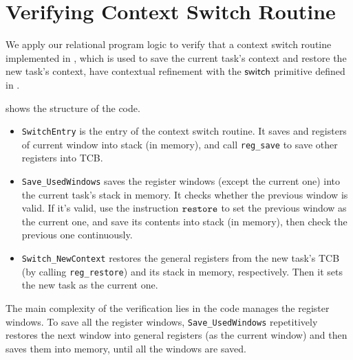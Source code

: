 \section{Verifying Context Switch Routine}
\label{sec:ctxswitch}

\indent
We apply our relational program logic to verify
that a context switch routine implemented in \sparc,
which is used to save the current task's context and
restore the new task's context, 
have contextual refinement with the $\mathsf{switch}{}$ primitive 
defined in \Sec{\ref{sec:refine-verification-sparc}}. 

\Fig{\ref{fig:The Structure of Context Switch Routine}}
shows the structure of the code.
\begin{center}
    
	\label{fig:The Structure of Context Switch Routine}
\end{center}
\begin{itemize}
    \item \texttt{SwitchEntry}
    is the entry of the context switch routine. 
    It saves \localRN{} and \inRN{} registers of current
    window into stack (in memory), and call 
    \texttt{reg\_save} to save other registers into TCB.
    
    \item
    \texttt{Save\_UsedWindows} saves
	the register windows (except the current one)
    into the current task's stack in memory. 
    It checks whether the previous window is valid. 
    If it's valid, use the instruction $\texttt{restore}{}$ 
    to set the previous window as the current one, 
    and save its contents into stack (in memory), 
    then check the previous one continuously.

    \item     
    \texttt{Switch\_NewContext}
    restores the general registers from the new task's TCB 
    (by calling \texttt{reg\_restore})
    and its stack in memory,
    respectively. Then it sets the new task as
    the current one.
\end{itemize}

The main complexity of the verification lies in
the code manages the register windows.
To save all the register windows, \texttt{Save\_UsedWindows}
repetitively restores the next window into general registers
(as the current window)
and then saves them into memory, until all the windows are saved.


